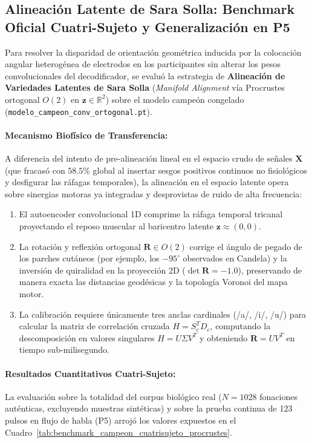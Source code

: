 \documentclass[11pt,a4paper,openany]{book}
\theoremstyle{definition}
\begin{document}
\subsection{Alineación Latente de Sara Solla: Benchmark Oficial Cuatri-Sujeto y Generalización en P5}
\label{subsec:alineacion_latente_sara_solla_cuatrisujeto}

Para resolver la disparidad de orientación geométrica inducida por la colocación angular heterogénea de electrodos en los participantes sin alterar los pesos convolucionales del decodificador, se evaluó la estrategia de \textbf{Alineación de Variedades Latentes de Sara Solla} (\textit{Manifold Alignment} vía Procrustes ortogonal $O(2)$ en $\mathbf{z} \in \mathbb{R}^2$) sobre el modelo campeón congelado (\texttt{modelo\_campeon\_conv\_ortogonal.pt}).

\paragraph{Mecanismo Biofísico de Transferencia:}
A diferencia del intento de pre-alineación lineal en el espacio crudo de señales $\mathbf{X}$ (que fracasó con $58.5\%$ global al insertar sesgos positivos continuos no fisiológicos y desfigurar las ráfagas temporales), la alineación en el espacio latente opera sobre sinergias motoras ya integradas y desprovistas de ruido de alta frecuencia:
\begin{enumerate}
    \item El autoencoder convolucional 1D comprime la ráfaga temporal tricanal proyectando el reposo muscular al baricentro latente $\mathbf{z} \approx (0,0)$.
    \item La rotación y reflexión ortogonal $\mathbf{R} \in O(2)$ corrige el ángulo de pegado de los parches cutáneos (por ejemplo, los $-95^\circ$ observados en Candela) y la inversión de quiralidad en la proyección 2D ($\det \mathbf{R} = -1.0$), preservando de manera exacta las distancias geodésicas y la topología Voronoi del mapa motor.
    \item La calibración requiere únicamente tres anclas cardinales (/a/, /i/, /u/) para calcular la matriz de correlación cruzada $H = S_c^T D_c$, computando la descomposición en valores singulares $H = U \Sigma V^T$ y obteniendo $\mathbf{R} = U V^T$ en tiempo sub-milisegundo.
\end{enumerate}

\paragraph{Resultados Cuantitativos Cuatri-Sujeto:}
La evaluación sobre la totalidad del corpus biológico real ($N = 1028$ fonaciones auténticas, excluyendo muestras sintéticas) y sobre la prueba continua de 123 pulsos en flujo de habla (P5) arrojó los valores expuestos en el Cuadro~\ref{tab:benchmark_campeon_cuatrisujeto_procrustes}.
\end{document}
